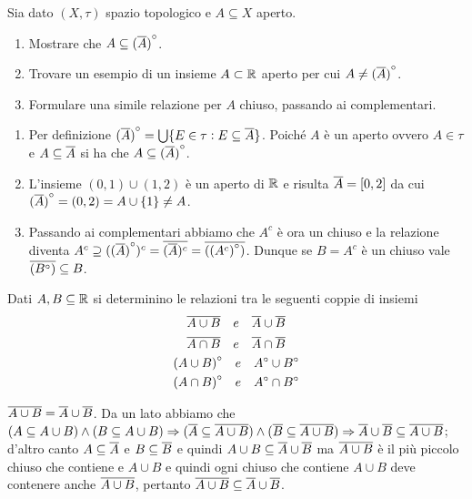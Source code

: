 \begin{es}
  Sia dato $ (X, \tau) $ spazio topologico e $ A \subseteq X $ aperto.
  \begin{enumerate}[label = (\roman*)]
  \item Mostrare che $ A \subseteq {(\overline{A})}^{\circ} $.
  \item Trovare un esempio di un insieme $ A \subset \mathbb{R} $ aperto per cui $ A \neq {(\overline{A})}^{\circ} $.
  \item Formulare una simile relazione per $ A $ chiuso, passando ai complementari.
  \end{enumerate}
\end{es}
%
\begin{enumerate}[label = (\roman*)]
\item Per definizione $ {(\overline{A})}^{\circ} = \bigcup \{E \in \tau : E \subseteq \overline{A}\} $. Poiché $ A $ è un aperto ovvero $ A \in \tau $ e $ A \subseteq \overline{A} $ si ha che $ A \subseteq {(\overline{A})}^{\circ} $.
\item L'insieme $ (0, 1) \cup (1, 2) $ è un aperto di $ \mathbb{R} $ e risulta $ \overline{A} = [0, 2] $ da cui $ {(\overline{A})}^{\circ} = (0, 2) = A \cup \{1\} \neq A $.
\item Passando ai complementari abbiamo che $ A^c $ è ora un chiuso e la relazione diventa $ A^c \supseteq ({(\overline{A})}^{\circ})^c = \overline{(\overline{A})^c} = \overline{({(A^c)}^{\circ})} $. Dunque se $ B = A^c $ è un chiuso vale $ \overline{({B}^{\circ})} \subseteq B $.
\end{enumerate}

\begin{es}
  Dati $ A, B \subseteq \mathbb{R} $ si determinino le relazioni tra le seguenti coppie di insiemi
  \begin{gather*}
    \overline{A \cup B} \quad e \quad \overline{A} \cup \overline{B}   \\
    \overline{A \cap B} \quad e \quad \overline{A} \cap \overline{B}   \\
    {(A \cup B)}^{\circ} \quad e \quad {A}^{\circ} \cup {B}^{\circ} \\
    {(A \cap B)}^{\circ} \quad e \quad {A}^{\circ} \cap {B}^{\circ}
  \end{gather*}
\end{es}
%
$ \overline{A \cup B} = \overline{A} \cup \overline{B} $. Da un lato abbiamo che $ (A \subseteq A \cup B) \wedge (B \subseteq A \cup B) \Rightarrow (\overline{A} \subseteq \overline{A \cup B}) \wedge (\overline{B} \subseteq \overline{A \cup B}) \Rightarrow \overline{A} \cup \overline{B} \subseteq \overline{A \cup B} $; d'altro canto $ A \subseteq \overline{A} $ e $ B \subseteq \overline{B} $ e quindi $ A \cup B \subseteq \overline{A} \cup \overline{B} $ ma $ \overline{A \cup B} $ è il più piccolo chiuso che contiene e $ A \cup B $ e quindi ogni chiuso che contiene $ A \cup B $ deve contenere anche $ \overline{A \cup B} $, pertanto $ \overline{A \cup B} \subseteq \overline{A} \cup \overline{B} $. \\

